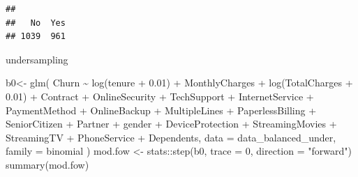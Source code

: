 \documentclass[
  twoside]{article}
\newenvironment{Shaded}{\begin{snugshade}}{\end{snugshade}}
\newcommand{\AttributeTok}[1]{\textcolor[rgb]{0.77,0.63,0.00}{#1}}
\newcommand{\DecValTok}[1]{\textcolor[rgb]{0.00,0.00,0.81}{#1}}
\newcommand{\FloatTok}[1]{\textcolor[rgb]{0.00,0.00,0.81}{#1}}
\newcommand{\FunctionTok}[1]{\textcolor[rgb]{0.00,0.00,0.00}{#1}}
\newcommand{\NormalTok}[1]{#1}
\newcommand{\OtherTok}[1]{\textcolor[rgb]{0.56,0.35,0.01}{#1}}
\newcommand{\SpecialCharTok}[1]{\textcolor[rgb]{0.00,0.00,0.00}{#1}}
\newcommand{\StringTok}[1]{\textcolor[rgb]{0.31,0.60,0.02}{#1}}
\begin{document}
\begin{verbatim}
## 
##   No  Yes 
## 1039  961
\end{verbatim}

undersampling

\begin{Shaded}
\begin{Highlighting}[]
\NormalTok{b0}\OtherTok{\textless{}{-}} \FunctionTok{glm}\NormalTok{(}
\NormalTok{  Churn }\SpecialCharTok{\textasciitilde{}} \FunctionTok{log}\NormalTok{(tenure }\SpecialCharTok{+} \FloatTok{0.01}\NormalTok{)}
  \SpecialCharTok{+}\NormalTok{ MonthlyCharges}
  \SpecialCharTok{+} \FunctionTok{log}\NormalTok{(TotalCharges }\SpecialCharTok{+} \FloatTok{0.01}\NormalTok{)}
  \SpecialCharTok{+}\NormalTok{ Contract }\SpecialCharTok{+}\NormalTok{ OnlineSecurity }\SpecialCharTok{+}\NormalTok{ TechSupport }\SpecialCharTok{+}\NormalTok{ InternetService }\SpecialCharTok{+}\NormalTok{ PaymentMethod }
  \SpecialCharTok{+}\NormalTok{ OnlineBackup }\SpecialCharTok{+}\NormalTok{ MultipleLines }\SpecialCharTok{+}\NormalTok{ PaperlessBilling }\SpecialCharTok{+}\NormalTok{ SeniorCitizen }\SpecialCharTok{+}\NormalTok{ Partner }
  \SpecialCharTok{+}\NormalTok{ gender }\SpecialCharTok{+}\NormalTok{ DeviceProtection }\SpecialCharTok{+}\NormalTok{ StreamingMovies }\SpecialCharTok{+}\NormalTok{ StreamingTV }\SpecialCharTok{+}\NormalTok{ PhoneService }
  \SpecialCharTok{+}\NormalTok{ Dependents,}
  \AttributeTok{data =}\NormalTok{ data\_balanced\_under,}
  \AttributeTok{family =}\NormalTok{ binomial}
\NormalTok{)}
\NormalTok{mod.fow }\OtherTok{\textless{}{-}}\NormalTok{ stats}\SpecialCharTok{::}\FunctionTok{step}\NormalTok{(b0, }\AttributeTok{trace =} \DecValTok{0}\NormalTok{, }\AttributeTok{direction =} \StringTok{"forward"}\NormalTok{)}
\FunctionTok{summary}\NormalTok{(mod.fow)}
\end{Highlighting}
\end{Shaded}
\end{document}
